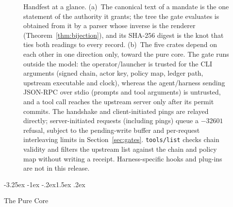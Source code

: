 \documentclass[10pt,twocolumn]{article}
\makeatletter
\theoremstyle{plain}
\theoremstyle{definition}
\renewcommand\subsection{\@startsection{subsection}{2}{\z@}%
  {-3.25ex \@plus -1ex \@minus -.2ex}{1.5ex \@plus .2ex}%
  {\normalfont\large\bfseries\raggedright}}
\makeatother
\begin{document}
\begin{figure}[p]
\caption{Handfest at a glance. (a)~The canonical text of a mandate is the one statement of the authority it grants; the tree the gate evaluates is obtained from it by a parser whose inverse is the renderer (Theorem~\ref{thm:bijection}), and its SHA-256 digest is the knot that ties both readings to every record. (b)~The five crates depend on each other in one direction only, toward the pure core. The gate runs outside the model: the operator/launcher is trusted for the CLI arguments (signed chain, actor key, policy map, ledger path, upstream executable and clock), whereas the agent/harness sending JSON-RPC over stdio (prompts and tool arguments) is untrusted, and a tool call reaches the upstream server only after its permit commits. The handshake and client-initiated pings are relayed directly; server-initiated requests (including pings) queue a $-32601$ refusal, subject to the pending-write buffer and per-request interleaving limits in Section~\ref{sec:gates}. \texttt{tools/list} checks chain validity and filters the upstream list against the chain and policy map without writing a receipt. Harness-specific hooks and plug-ins are not in this release.}
\label{fig:arch}
\end{figure}


\subsection{The Pure Core}
\label{sec:core}
\end{document}

